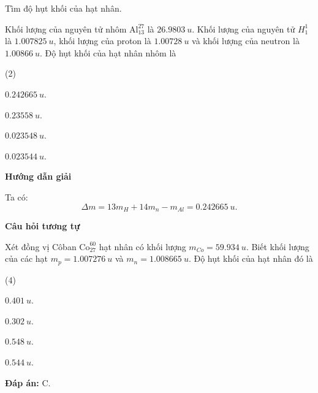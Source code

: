 \begin{dang}{Tìm độ hụt khối của hạt nhân.}
	{Khối lượng của nguyên tử nhôm $ \text{Al}_{13}^{27} $ là $ \SI{26,9803}{u} $. Khối lượng của nguyên tử $ H_{1}^{1} $ là $ \SI{1,007825}{u} $, khối lượng của proton là $ \SI{1,00728}{u} $ và khối lượng của neutron là $ \SI{1,00866}{u} $. Độ hụt khối của hạt nhân nhôm là
		\begin{mcq}(2)
			\item $ \SI{0,242665}{u} $.
			\item $ \SI{0,23558}{u} $.
			\item $ \SI{0,023548}{u} $.
			\item $ \SI{0,023544}{u} $.
		\end{mcq}
	}
	{
		\begin{center}
			\textbf{Hướng dẫn giải}
		\end{center}
		Ta có:
		$$
		\Delta m = 13m_{H} + 14m_{n} - m_{Al} = \SI{0,242665}{u}.
		$$
		\begin{center}
			\textbf{Câu hỏi tương tự}
		\end{center}
		
		Xét đồng vị Côban $ \text{Co}_{27}^{60} $ hạt nhân có khối lượng $ m_{Co} = \SI{59,934}{u} $. Biết khối lượng của các hạt $ m_{p} = \SI{1,007276}{u} $ và $ m_{n} = \SI{1,008665}{u} $. Độ hụt khối của hạt nhân đó là
		\begin{mcq}(4)
			\item $ \SI{0,401}{u} $.
			\item $ \SI{0,302}{u} $.
			\item $ \SI{0,548}{u} $.
			\item $ \SI{0,544}{u} $.
		\end{mcq}
		\textbf{Đáp án:} C.
	}
	
\end{dang}


